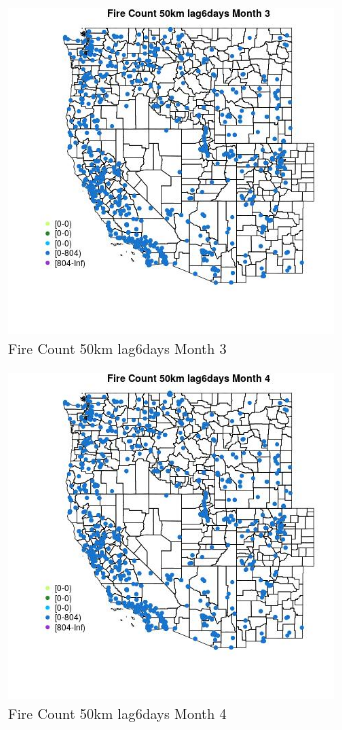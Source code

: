 \begin{figure} 
\centering  
\includegraphics[width=0.77\textwidth]{Code_Outputs/Report_ML_input_PM25_Step4_part_f_de_duplicated_aves_prioritize_24hr_obswNAs_MapObsMo3Fire_Count_50km_lag6days.jpg} 
\caption{\label{fig:Report_ML_input_PM25_Step4_part_f_de_duplicated_aves_prioritize_24hr_obswNAsMapObsMo3Fire_Count_50km_lag6days}Fire Count 50km lag6days Month 3} 
\end{figure} 
 

\begin{figure} 
\centering  
\includegraphics[width=0.77\textwidth]{Code_Outputs/Report_ML_input_PM25_Step4_part_f_de_duplicated_aves_prioritize_24hr_obswNAs_MapObsMo4Fire_Count_50km_lag6days.jpg} 
\caption{\label{fig:Report_ML_input_PM25_Step4_part_f_de_duplicated_aves_prioritize_24hr_obswNAsMapObsMo4Fire_Count_50km_lag6days}Fire Count 50km lag6days Month 4} 
\end{figure} 
 

